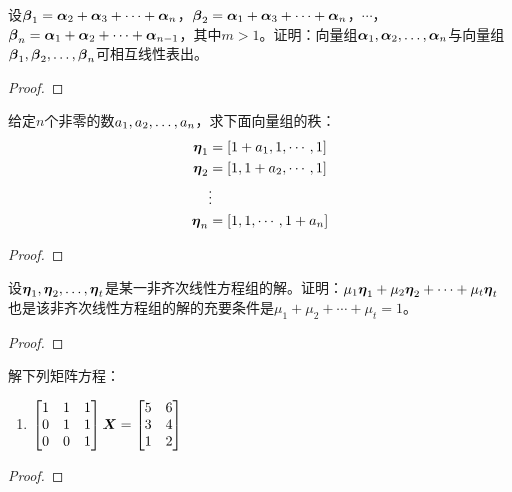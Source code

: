 \begin{problem}
设\(\boldsymbol{\beta}_1=\boldsymbol{\alpha}_2+\boldsymbol{\alpha}_3+\cdots+\boldsymbol{\alpha}_{n}\)，\(\boldsymbol{\beta}_2=\boldsymbol{\alpha}_1+\boldsymbol{\alpha}_3+\cdots+\boldsymbol{\alpha}_{n}\)，\(\cdots\)，\(\boldsymbol{\beta}_n=\boldsymbol{\alpha}_1+\boldsymbol{\alpha}_2+\cdots+\boldsymbol{\alpha}_{n-1}\)，其中\(m>1\)。证明：向量组\({\boldsymbol{\alpha}}_1,{\boldsymbol{\alpha}}_2,\dots,{\boldsymbol{\alpha}}_{n}\)与向量组\({\boldsymbol{\beta}}_1,{\boldsymbol{\beta}}_2,\dots,{\boldsymbol{\beta}}_{n}\)可相互线性表出。
\end{problem}
\begin{proof}

\end{proof}

\setcounter{problem}{34}
\begin{problem}
给定\(n\)个非零的数\({a}_1,{a}_2,\dots,{a}_{n}\)，求下面向量组的秩：
\begin{align*}
    \boldsymbol{\eta}_1 & =\left[ 1+a_1,1,\cdots,1 \right] \\
    \boldsymbol{\eta}_2 & =\left[ 1,1+a_2,\cdots,1 \right] \\
              & \vdots                  \\
    \boldsymbol{\eta}_n & =\left[ 1,1,\cdots,1+a_n \right]
\end{align*}
\end{problem}
\begin{proof}

\end{proof}

\setcounter{problem}{36}
\begin{problem}
设\({\boldsymbol{\eta}}_1,{\boldsymbol{\eta}}_2,\dots,{\boldsymbol{\eta}}_{t}\)是某一非齐次线性方程组的解。证明：\(\mu_1\boldsymbol{\eta}_1+\mu_2\boldsymbol{\eta}_2+\cdots+\mu_t\boldsymbol{\eta}_t\)也是该非齐次线性方程组的解的充要条件是\(\mu_1+\mu_2+\cdots+\mu_t=1\)。
\end{problem}
\begin{proof}

\end{proof}

\setcounter{problem}{39}
\begin{problem}
解下列矩阵方程：
\begin{enumerate}
    \item \(\begin{bmatrix}1&1&1\\0&1&1\\0&0&1\end{bmatrix}\boldsymbol{X}=\begin{bmatrix}5&6\\3&4\\1&2\end{bmatrix}\)
\end{enumerate}
\end{problem}
\begin{proof}

\end{proof}


